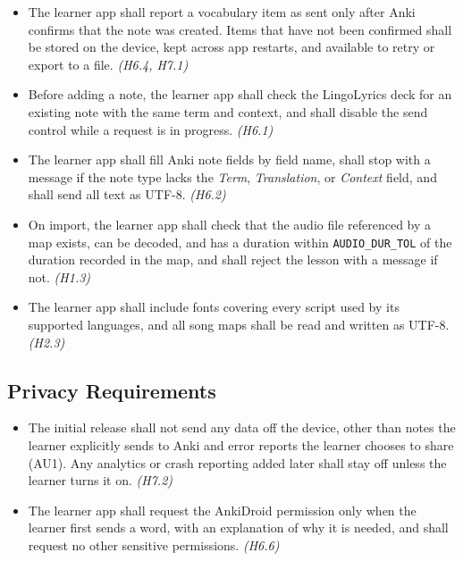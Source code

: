\documentclass{article}
\begin{document}
\begin{itemize}
  \item[IN8.] The learner app shall report a vocabulary item as sent only
        after Anki confirms that the note was created. Items that have not
        been confirmed shall be stored on the device, kept across app
        restarts, and available to retry or export to a file.
        \emph{(H6.4, H7.1)}
  \item[IN9.] Before adding a note, the learner app shall check the
        LingoLyrics deck for an existing note with the same term and context,
        and shall disable the send control while a request is in progress.
        \emph{(H6.1)}
  \item[IN10.] The learner app shall fill Anki note fields by field name,
        shall stop with a message if the note type lacks the \emph{Term},
        \emph{Translation}, or \emph{Context} field, and shall send all text
        as UTF-8. \emph{(H6.2)}
  \item[IN11.] On import, the learner app shall check that the audio file
        referenced by a map exists, can be decoded, and has a duration within
        \texttt{AUDIO\_DUR\_TOL} of the duration recorded in the map, and
        shall reject the lesson with a message if not. \emph{(H1.3)}
  \item[IN12.] The learner app shall include fonts covering every script used
        by its supported languages, and all song maps shall be read and
        written as UTF-8. \emph{(H2.3)}
\end{itemize}

\subsection{Privacy Requirements}

\begin{itemize}
  \item[PR1.] The initial release shall not send any data off the device,
        other than notes the learner explicitly sends to Anki and error reports
        the learner chooses to share (AU1). Any analytics or crash reporting
        added later shall stay off unless the learner turns it on.
        \emph{(H7.2)}
  \item[PR2.] The learner app shall request the AnkiDroid permission only when
        the learner first sends a word, with an explanation of why it is
        needed, and shall request no other sensitive permissions.
        \emph{(H6.6)}
\end{itemize}
\end{document}
